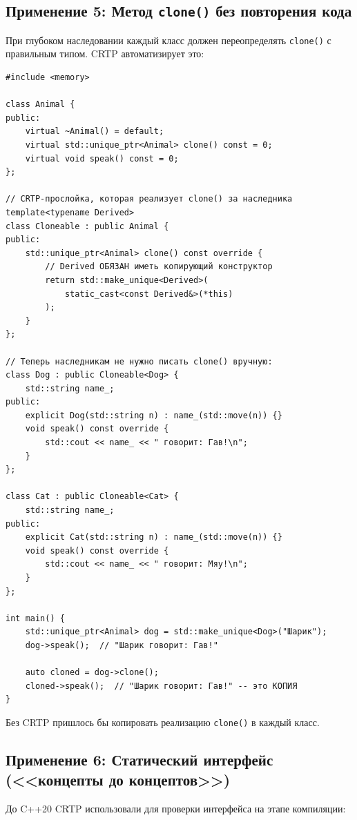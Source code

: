 \documentclass[a4paper,12pt]{article}
\begin{document}
\subsection{Применение 5: Метод \texttt{clone()} без повторения кода}

При глубоком наследовании каждый класс должен переопределять \texttt{clone()}
с правильным типом. CRTP автоматизирует это:

\begin{lstlisting}
#include <memory>

class Animal {
public:
    virtual ~Animal() = default;
    virtual std::unique_ptr<Animal> clone() const = 0;
    virtual void speak() const = 0;
};

// CRTP-прослойка, которая реализует clone() за наследника
template<typename Derived>
class Cloneable : public Animal {
public:
    std::unique_ptr<Animal> clone() const override {
        // Derived ОБЯЗАН иметь копирующий конструктор
        return std::make_unique<Derived>(
            static_cast<const Derived&>(*this)
        );
    }
};

// Теперь наследникам не нужно писать clone() вручную:
class Dog : public Cloneable<Dog> {
    std::string name_;
public:
    explicit Dog(std::string n) : name_(std::move(n)) {}
    void speak() const override {
        std::cout << name_ << " говорит: Гав!\n";
    }
};

class Cat : public Cloneable<Cat> {
    std::string name_;
public:
    explicit Cat(std::string n) : name_(std::move(n)) {}
    void speak() const override {
        std::cout << name_ << " говорит: Мяу!\n";
    }
};

int main() {
    std::unique_ptr<Animal> dog = std::make_unique<Dog>("Шарик");
    dog->speak();  // "Шарик говорит: Гав!"

    auto cloned = dog->clone();
    cloned->speak();  // "Шарик говорит: Гав!" -- это КОПИЯ
}
\end{lstlisting}

Без CRTP пришлось бы копировать реализацию \texttt{clone()} в каждый класс.

\subsection{Применение 6: Статический интерфейс (<<концепты до концептов>>)}

До C++20 CRTP использовали для проверки интерфейса на этапе компиляции:
\end{document}
